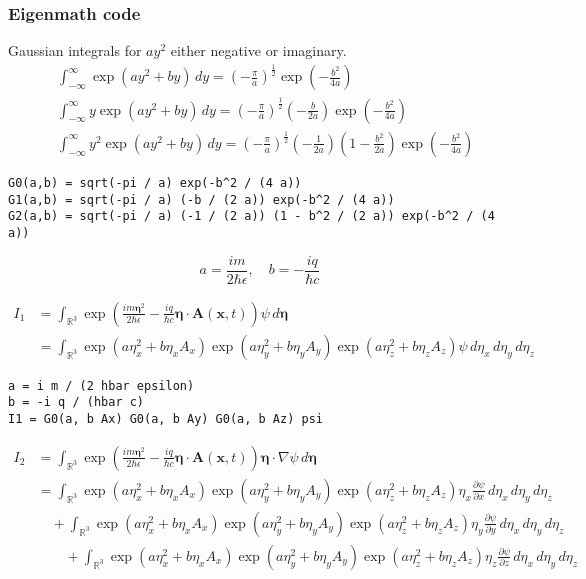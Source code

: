 \subsubsection*{Eigenmath code}

Gaussian integrals for $ay^2$ either negative or imaginary.
\begin{align*}
&\int_{-\infty}^\infty\exp(ay^2+by)\,dy
=\left(-\frac{\pi}{a}\right)^\frac{1}{2}
\exp\left(-\frac{b^2}{4a}\right)
\\
&\int_{-\infty}^\infty y\exp(ay^2+by)\,dy
=\left(-\frac{\pi}{a}\right)^\frac{1}{2}
\left(-\frac{b}{2a}\right)
\exp\left(-\frac{b^2}{4a}\right)
\\
&\int_{-\infty}^\infty y^2\exp(ay^2+by)\,dy
=\left(-\frac{\pi}{a}\right)^\frac{1}{2}
\left(-\frac{1}{2a}\right)
\left(1-\frac{b^2}{2a}\right)
\exp\left(-\frac{b^2}{4a}\right)
\end{align*}

{\footnotesize\begin{verbatim}
G0(a,b) = sqrt(-pi / a) exp(-b^2 / (4 a))
G1(a,b) = sqrt(-pi / a) (-b / (2 a)) exp(-b^2 / (4 a))
G2(a,b) = sqrt(-pi / a) (-1 / (2 a)) (1 - b^2 / (2 a)) exp(-b^2 / (4 a))
\end{verbatim}}

\begin{equation*}
a=\frac{im}{2\hbar\epsilon},\quad
b=-\frac{iq}{\hbar c}
\end{equation*}

\begin{align*}
I_1&=\int_{\mathbb R^3}
\exp\left(\frac{im\boldsymbol\eta^2}{2\hbar\epsilon}
-\frac{iq}{\hbar c}\boldsymbol\eta\cdot\mathbf A(\mathbf x,t)\right)
\psi\,d\boldsymbol\eta
\\
&=\int_{\mathbb R^3}
\exp\left(a\eta_x^2+b\eta_xA_x\right)
\exp\left(a\eta_y^2+b\eta_yA_y\right)
\exp\left(a\eta_z^2+b\eta_zA_z\right)
\psi\,d\eta_x\,d\eta_y\,d\eta_z
\end{align*}

{\footnotesize\begin{verbatim}
a = i m / (2 hbar epsilon)
b = -i q / (hbar c)
I1 = G0(a, b Ax) G0(a, b Ay) G0(a, b Az) psi
\end{verbatim}}

\begin{align*}
I_2&=\int_{\mathbb R^3}
\exp\left(\frac{im\boldsymbol\eta^2}{2\hbar\epsilon}
-\frac{iq}{\hbar c}\boldsymbol\eta\cdot\mathbf A(\mathbf x,t)\right)
\boldsymbol\eta\cdot\nabla\psi
\,d\boldsymbol\eta
\\
&=\int_{\mathbb R^3}
\exp\left(a\eta_x^2+b\eta_xA_x\right)
\exp\left(a\eta_y^2+b\eta_yA_y\right)
\exp\left(a\eta_z^2+b\eta_zA_z\right)\eta_x\frac{\partial\psi}{\partial x}
\,d\eta_x\,d\eta_y\,d\eta_z
\\
&\quad{}+\int_{\mathbb R^3}
\exp\left(a\eta_x^2+b\eta_xA_x\right)
\exp\left(a\eta_y^2+b\eta_yA_y\right)
\exp\left(a\eta_z^2+b\eta_zA_z\right)\eta_y\frac{\partial\psi}{\partial y}
\,d\eta_x\,d\eta_y\,d\eta_z
\\
&\quad\quad{}+\int_{\mathbb R^3}
\exp\left(a\eta_x^2+b\eta_xA_x\right)
\exp\left(a\eta_y^2+b\eta_yA_y\right)
\exp\left(a\eta_z^2+b\eta_zA_z\right)\eta_z\frac{\partial\psi}{\partial z}
\,d\eta_x\,d\eta_y\,d\eta_z
\end{align*}

